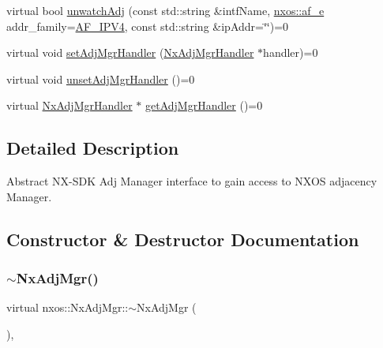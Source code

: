 \begin{DoxyCompactItemize}
\item 
virtual bool \mbox{\hyperlink{classnxos_1_1_nx_adj_mgr_a70afce2634199180031767e150332687}{unwatch\+Adj}} (const std\+::string \&intf\+Name, \mbox{\hyperlink{namespacenxos_a3a667f48b94db10aa398940dc5bf72d7}{nxos\+::af\+\_\+e}} addr\+\_\+family=\mbox{\hyperlink{namespacenxos_a3a667f48b94db10aa398940dc5bf72d7a038f37de02a2c9ee1acbc4e184583628}{A\+F\+\_\+\+I\+P\+V4}}, const std\+::string \&ip\+Addr=\char`\"{}\char`\"{})=0
\item 
virtual void \mbox{\hyperlink{classnxos_1_1_nx_adj_mgr_afc37b95ddfe24357cfd0803cad8feb74}{set\+Adj\+Mgr\+Handler}} (\mbox{\hyperlink{classnxos_1_1_nx_adj_mgr_handler}{Nx\+Adj\+Mgr\+Handler}} $\ast$handler)=0
\item 
virtual void \mbox{\hyperlink{classnxos_1_1_nx_adj_mgr_a9937a382ff7f6eb789b728a2512e37f3}{unset\+Adj\+Mgr\+Handler}} ()=0
\item 
virtual \mbox{\hyperlink{classnxos_1_1_nx_adj_mgr_handler}{Nx\+Adj\+Mgr\+Handler}} $\ast$ \mbox{\hyperlink{classnxos_1_1_nx_adj_mgr_a0a25f49f42b92d373d341d3b013c7404}{get\+Adj\+Mgr\+Handler}} ()=0
\end{DoxyCompactItemize}


\subsection{Detailed Description}
Abstract N\+X-\/\+S\+DK Adj Manager interface to gain access to N\+X\+OS adjacency Manager. 

\subsection{Constructor \& Destructor Documentation}
\mbox{\label{classnxos_1_1_nx_adj_mgr_a771d390eda9cac623c3b8f9452721da5}} 
\subsubsection{\texorpdfstring{$\sim$\+Nx\+Adj\+Mgr()}{~NxAdjMgr()}}
{\footnotesize\ttfamily virtual nxos\+::\+Nx\+Adj\+Mgr\+::$\sim$\+Nx\+Adj\+Mgr (\begin{DoxyParamCaption}{ }\end{DoxyParamCaption})\hspace{0.3cm}{\ttfamily [inline]}, {\ttfamily [virtual]}}

